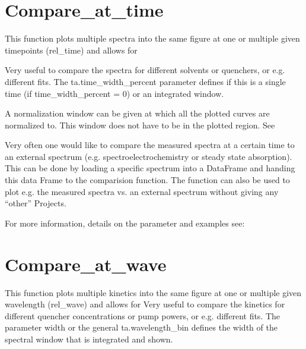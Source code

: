 \documentclass[letterpaper,10pt,english]{sphinxmanual}
\begin{document}
\section{Compare\_at\_time}
\label{\detokenize{Comparing:compare-at-time}}
This function plots multiple spectra into the same figure at one or multiple given timepoints (rel\_time) and
allows for {\hyperref[\detokenize{Comparing:normalization-and-scaling}]{}}

Very useful to compare the spectra for different solvents or quenchers, or e.g. different fits.
The ta.time\_width\_percent parameter defines if this is a single time
(if time\_width\_percent = 0) or an integrated window.

A normalization window can be given at which all the plotted curves are normalized to.
This window does not have to be in the plotted region. See {\hyperref[\detokenize{Comparing:normalization-and-scaling}]{}}

Very often one would like to compare the measured spectra at a certain
time to an external spectrum (e.g. spectro\sphinxhyphen{}electro\sphinxhyphen{}chemistry or steady
state absorption). This can be done by loading a specific spectrum into
a DataFrame and handing this data Frame to the comparision function. The
function can also be used to plot e.g. the measured spectra vs. an
external spectrum without giving any “other” Projects.

For more information, details on the parameter and examples see:

{\hyperref[\detokenize{plot_func:plot_func.TA.Compare_at_time}]{}}


\section{Compare\_at\_wave}
\label{\detokenize{Comparing:compare-at-wave}}
This function plots multiple kinetics into the same figure at one or
multiple given wavelength (rel\_wave) and  allows for {\hyperref[\detokenize{Comparing:normalization-and-scaling}]{}}
Very useful to compare the kinetics for different quencher concentrations or
pump powers, or e.g. different fits. The parameter width or the general ta.wavelength\_bin
defines the width of the spectral window that is integrated and shown.
\end{document}
